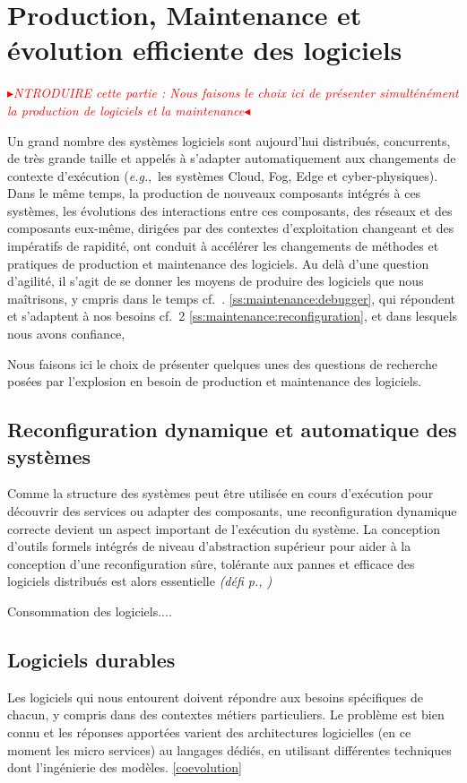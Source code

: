 \documentclass[11pt]{article}
\newcommand{\mynote}[3][black]{\textcolor{#1}{\fbox{\bfseries\sffamily\scriptsize{#2}}
{\small$\blacktriangleright$\textsf{\emph{#3}}$\blacktriangleleft$}}}
\newcommand{\TODO}[1]{\mynote[red]{TODO}{#1}}
\newcommand{\eg}[0]{\emph{e.g.},~}
\newcommand{\cf}[0]{cf.~}
\newcommand{\defi}[1]{\emph{(défi p.\pageref{#1}, \cite{#1})}}
\begin{document}
\section{Production, Maintenance et évolution efficiente des logiciels}
\TODO{NTRODUIRE cette partie :  Nous faisons le choix ici de présenter simulténément la production de logiciels et la maintenance}

Un grand nombre des systèmes logiciels sont aujourd'hui distribués, concurrents, de très grande taille et appelés à s'adapter automatiquement aux changements de contexte d'exécution (\eg les systèmes Cloud, Fog, Edge et cyber-physiques). 
Dans le même temps, la production de nouveaux composants intégrés à ces systèmes, les évolutions des interactions entre ces composants, des réseaux et des composants eux-même, dirigées par des contextes d'exploitation changeant et des impératifs de rapidité, ont conduit à accélérer les changements de méthodes et pratiques de production et maintenance des logiciels.   Au delà d'une question d'agilité, il s'agit de se donner les moyens de produire des logiciels que nous maîtrisons, y cmpris dans le temps \cf. \ref{ss:maintenance:debugger}, qui répondent et s'adaptent à nos besoins \cf 2 \ref{ss:maintenance:reconfiguration}, et dans lesquels nous avons confiance,

Nous faisons ici le choix de présenter quelques unes des questions de recherche posées par l'explosion en besoin de production et maintenance des logiciels.


\subsection{Reconfiguration dynamique et automatique des systèmes \label{ss:maintenance:reconfiguration}}
Comme la structure des systèmes peut être utilisée en cours d'exécution pour découvrir des services ou adapter des composants, une reconfiguration dynamique correcte devient un aspect important de l'exécution du système. La conception d'outils formels intégrés de niveau d'abstraction supérieur pour aider à la conception d'une reconfiguration sûre, tolérante aux pannes et efficace des logiciels distribués est alors essentielle \defi{reconfiguration}

Consommation des logiciels....




\subsection{Logiciels durables}
Les logiciels qui nous entourent doivent répondre aux besoins spécifiques de chacun, y compris dans des contextes métiers particuliers. Le problème est bien connu et les réponses apportées varient des architectures logicielles (en ce moment les micro services) au langages dédiés, en utilisant différentes techniques dont l'ingénierie des modèles. \ref{coevolution}
\end{document}
